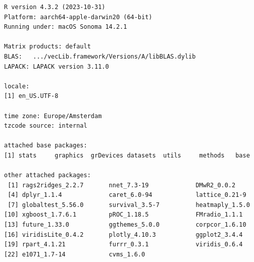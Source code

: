 \documentclass{amsart}
\begin{document}
\begin{verbatim}
R version 4.3.2 (2023-10-31)
Platform: aarch64-apple-darwin20 (64-bit)
Running under: macOS Sonoma 14.2.1

Matrix products: default
BLAS:   .../vecLib.framework/Versions/A/libBLAS.dylib 
LAPACK: LAPACK version 3.11.0

locale:
[1] en_US.UTF-8

time zone: Europe/Amsterdam
tzcode source: internal

attached base packages:
[1] stats     graphics  grDevices datasets  utils     methods   base     

other attached packages:
 [1] rags2ridges_2.2.7       nnet_7.3-19             DMwR2_0.0.2                       
 [4] dplyr_1.1.4             caret_6.0-94            lattice_0.21-9                    
 [7] globaltest_5.56.0       survival_3.5-7          heatmaply_1.5.0               
[10] xgboost_1.7.6.1         pROC_1.18.5             FMradio_1.1.1       
[13] future_1.33.0           ggthemes_5.0.0          corpcor_1.6.10
[16] viridisLite_0.4.2       plotly_4.10.3           ggplot2_3.4.4
[19] rpart_4.1.21            furrr_0.3.1             viridis_0.6.4 
[22] e1071_1.7-14            cvms_1.6.0 


\end{verbatim}
\end{document}
